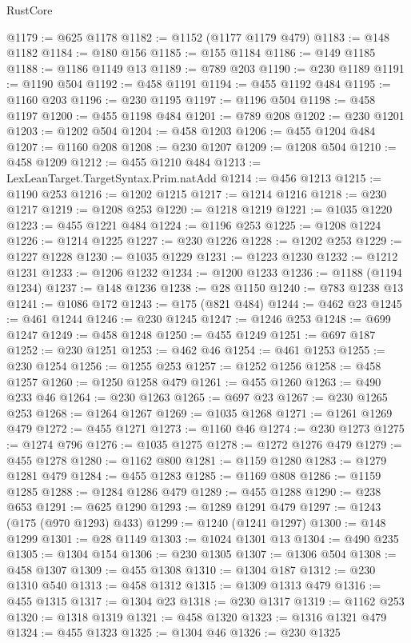 \begin{lexlean}{RustCore}
\begin{coremodule}
@1179 := @625 @1178
@1182 := @1152 (@1177 @1179 @479)
@1183 := @148 @1182
@1184 := @180 @156
@1185 := @155 @1184
@1186 := @149 @1185
@1188 := @1186 @1149 @13
@1189 := @789 @203
@1190 := @230 @1189
@1191 := @1190 @504
@1192 := @458 @1191
@1194 := @455 @1192 @484
@1195 := @1160 @203
@1196 := @230 @1195
@1197 := @1196 @504
@1198 := @458 @1197
@1200 := @455 @1198 @484
@1201 := @789 @208
@1202 := @230 @1201
@1203 := @1202 @504
@1204 := @458 @1203
@1206 := @455 @1204 @484
@1207 := @1160 @208
@1208 := @230 @1207
@1209 := @1208 @504
@1210 := @458 @1209
@1212 := @455 @1210 @484
@1213 := LexLeanTarget.TargetSyntax.Prim.natAdd
@1214 := @456 @1213
@1215 := @1190 @253
@1216 := @1202 @1215
@1217 := @1214 @1216
@1218 := @230 @1217
@1219 := @1208 @253
@1220 := @1218 @1219
@1221 := @1035 @1220
@1223 := @455 @1221 @484
@1224 := @1196 @253
@1225 := @1208 @1224
@1226 := @1214 @1225
@1227 := @230 @1226
@1228 := @1202 @253
@1229 := @1227 @1228
@1230 := @1035 @1229
@1231 := @1223 @1230
@1232 := @1212 @1231
@1233 := @1206 @1232
@1234 := @1200 @1233
@1236 := @1188 (@1194 @1234)
@1237 := @148 @1236
@1238 := @28 @1150
@1240 := @783 @1238 @13
@1241 := @1086 @172
@1243 := @175 (@821 @484)
@1244 := @462 @23
@1245 := @461 @1244
@1246 := @230 @1245
@1247 := @1246 @253
@1248 := @699 @1247
@1249 := @458 @1248
@1250 := @455 @1249
@1251 := @697 @187
@1252 := @230 @1251
@1253 := @462 @46
@1254 := @461 @1253
@1255 := @230 @1254
@1256 := @1255 @253
@1257 := @1252 @1256
@1258 := @458 @1257
@1260 := @1250 @1258 @479
@1261 := @455 @1260
@1263 := @490 @233 @46
@1264 := @230 @1263
@1265 := @697 @23
@1267 := @230 @1265 @253
@1268 := @1264 @1267
@1269 := @1035 @1268
@1271 := @1261 @1269 @479
@1272 := @455 @1271
@1273 := @1160 @46
@1274 := @230 @1273
@1275 := @1274 @796
@1276 := @1035 @1275
@1278 := @1272 @1276 @479
@1279 := @455 @1278
@1280 := @1162 @800
@1281 := @1159 @1280
@1283 := @1279 @1281 @479
@1284 := @455 @1283
@1285 := @1169 @808
@1286 := @1159 @1285
@1288 := @1284 @1286 @479
@1289 := @455 @1288
@1290 := @238 @653
@1291 := @625 @1290
@1293 := @1289 @1291 @479
@1297 := @1243 (@175 (@970 @1293) @433)
@1299 := @1240 (@1241 @1297)
@1300 := @148 @1299
@1301 := @28 @1149
@1303 := @1024 @1301 @13
@1304 := @490 @235
@1305 := @1304 @154
@1306 := @230 @1305
@1307 := @1306 @504
@1308 := @458 @1307
@1309 := @455 @1308
@1310 := @1304 @187
@1312 := @230 @1310 @540
@1313 := @458 @1312
@1315 := @1309 @1313 @479
@1316 := @455 @1315
@1317 := @1304 @23
@1318 := @230 @1317
@1319 := @1162 @253
@1320 := @1318 @1319
@1321 := @458 @1320
@1323 := @1316 @1321 @479
@1324 := @455 @1323
@1325 := @1304 @46
@1326 := @230 @1325

\end{coremodule}
\end{lexlean}

